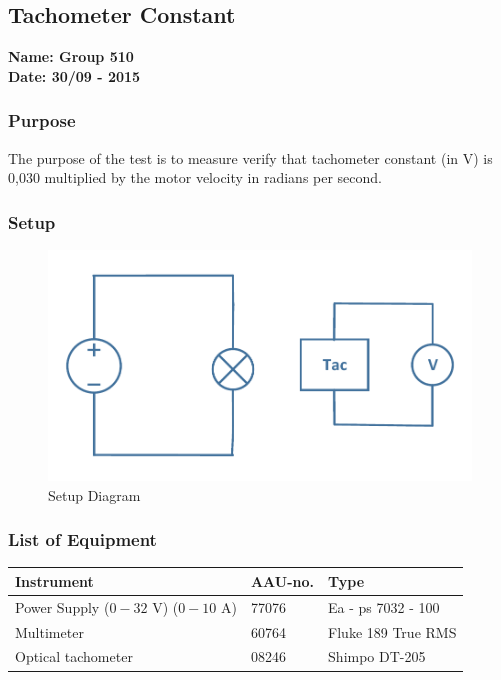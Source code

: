 \pagebreak
\subsection{Tachometer Constant} %
\textbf{Name: Group 510}\\
\textbf{Date: 30/09 - 2015}

\subsubsection{Purpose}
The purpose of the test is to measure verify that tachometer constant (in V) is 0,030 multiplied by the motor velocity in radians per second.

\subsubsection{Setup}
\begin{figure}[H]
  \centering
	\includegraphics[scale=0.5]{figures/MotorTest3.pdf}
	\caption{Setup Diagram}
	\flushleft
\end{figure}

\subsubsection{List of Equipment}

\begin{table}[H]
\begin{tabular}{|l|l|p{4cm}|}
\hline%
  \textbf{Instrument}                    &  \textbf{AAU-no.}  &  \textbf{Type}       \\
\hline%
  Power Supply ($0 - 32$ V) ($0 - 10$ A) &  77076             &  Ea - ps 7032 - 100  \\
\hline%
  Multimeter                             &  60764             &  Fluke 189 True RMS  \\
\hline%
  Optical tachometer                     &  08246             &  Shimpo DT-205       \\
\hline%
\end{tabular}
\end{table}

